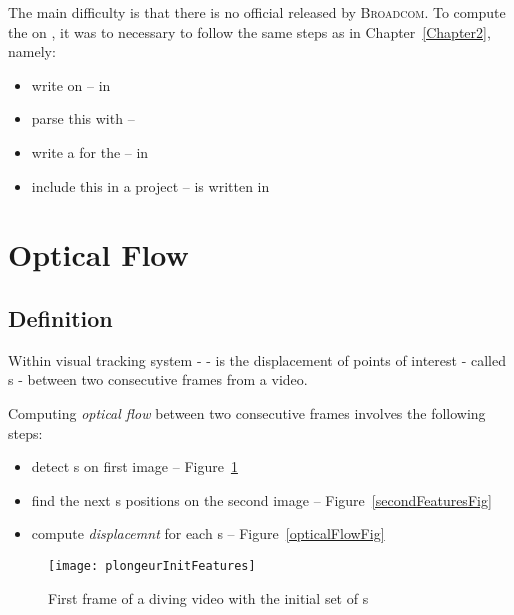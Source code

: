 The main difficulty is that there is no official  released by \textsc{Broadcom}. To compute the \flow{} on \rasp, it was to necessary to follow the same steps as in Chapter~\ref{Chapter2}, namely:
\begin{itemize}
	\item write  on  -- in 
	\item parse this  with  -- 
	\item write a  for the  -- in 
	\item include this  in a  project --  is written in 
\end{itemize}


\section{Optical Flow}

\subsection{Definition}

Within \iBubble{} visual tracking system -  - \flow{} is the displacement of points of interest - called \feat{}s - between two consecutive frames from a video.

Computing \emph{optical flow} between two consecutive frames involves the following steps:
\begin{itemize}
	\item detect \feat{}s on first image -- Figure~\ref{initFeaturesFig}
	\item find the next \feat{}s positions on the second image -- Figure~\ref{secondFeaturesFig}
	\item compute \emph{displacemnt} for each \feat{}s -- Figure~\ref{opticalFlowFig}
\end{itemize}


\begin{figure}[!htbp]
	\centering
	\texttt{[image: plongeurInitFeatures]}
	\caption{First frame of a diving video with the initial set of \feat{}s}
	\label{initFeaturesFig}
\end{figure}
\FloatBarrier



